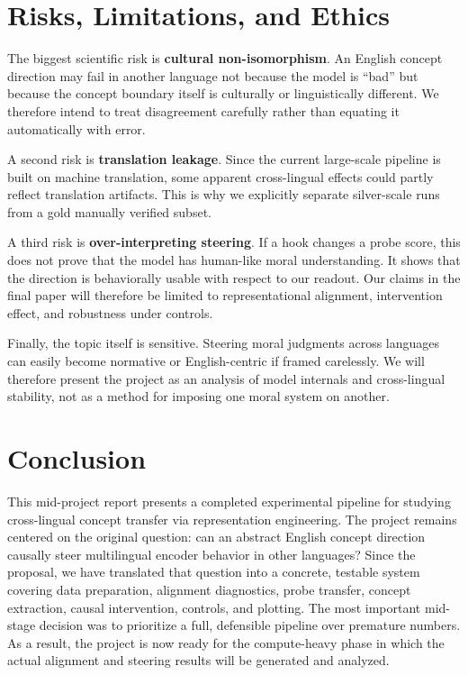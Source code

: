 \documentclass[11pt]{article}
\begin{document}
\section{Risks, Limitations, and Ethics}
The biggest scientific risk is \textbf{cultural non-isomorphism}. An English concept direction may fail in another language not because the model is ``bad'' but because the concept boundary itself is culturally or linguistically different. We therefore intend to treat disagreement carefully rather than equating it automatically with error.

A second risk is \textbf{translation leakage}. Since the current large-scale pipeline is built on machine translation, some apparent cross-lingual effects could partly reflect translation artifacts. This is why we explicitly separate silver-scale runs from a gold manually verified subset.

A third risk is \textbf{over-interpreting steering}. If a hook changes a probe score, this does not prove that the model has human-like moral understanding. It shows that the direction is behaviorally usable with respect to our readout. Our claims in the final paper will therefore be limited to representational alignment, intervention effect, and robustness under controls.

Finally, the topic itself is sensitive. Steering moral judgments across languages can easily become normative or English-centric if framed carelessly. We will therefore present the project as an analysis of model internals and cross-lingual stability, not as a method for imposing one moral system on another.

\section{Conclusion}
This mid-project report presents a completed experimental pipeline for studying cross-lingual concept transfer via representation engineering. The project remains centered on the original question: can an abstract English concept direction causally steer multilingual encoder behavior in other languages? Since the proposal, we have translated that question into a concrete, testable system covering data preparation, alignment diagnostics, probe transfer, concept extraction, causal intervention, controls, and plotting. The most important mid-stage decision was to prioritize a full, defensible pipeline over premature numbers. As a result, the project is now ready for the compute-heavy phase in which the actual alignment and steering results will be generated and analyzed.


\end{document}
